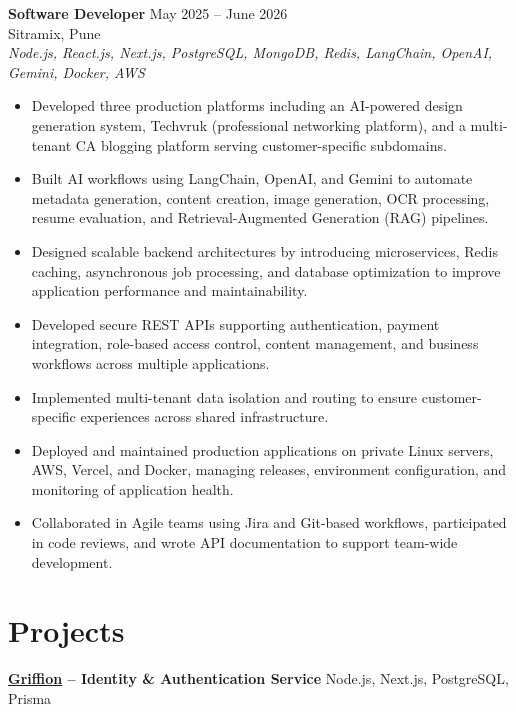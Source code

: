 \documentclass[a4paper,10pt]{article}
\begin{document}
\textbf{Software Developer} \hfill May 2025 -- June 2026\\
Sitramix, Pune\\
\textit{Node.js, React.js, Next.js, PostgreSQL, MongoDB, Redis, LangChain, OpenAI, Gemini, Docker, AWS}

\begin{itemize}[leftmargin=*]
    \item Developed three production platforms including an AI-powered design generation system, Techvruk (professional networking platform), and a multi-tenant CA blogging platform serving customer-specific subdomains.
    \item Built AI workflows using LangChain, OpenAI, and Gemini to automate metadata generation, content creation, image generation, OCR processing, resume evaluation, and Retrieval-Augmented Generation (RAG) pipelines.
    \item Designed scalable backend architectures by introducing microservices, Redis caching, asynchronous job processing, and database optimization to improve application performance and maintainability.
    \item Developed secure REST APIs supporting authentication, payment integration, role-based access control, content management, and business workflows across multiple applications.
    \item Implemented multi-tenant data isolation and routing to ensure customer-specific experiences across shared infrastructure.
    \item Deployed and maintained production applications on private Linux servers, AWS, Vercel, and Docker, managing releases, environment configuration, and monitoring of application health.
    \item Collaborated in Agile teams using Jira and Git-based workflows, participated in code reviews, and wrote API documentation to support team-wide development.
\end{itemize}

\section*{Projects}

\textbf{\href{https://github.com/ShivSarwade/Griffion}{Griffion} -- Identity \& Authentication Service} \hfill Node.js, Next.js, PostgreSQL, Prisma
\end{document}

